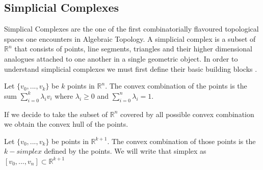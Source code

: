 \subsection{Simplicial Complexes}

Simplical Complexes are the one of the first combinatorially flavoured topological spaces one encounters in Algebraic Topology. A simplicial complex is a subset of $\mathbb{R}^n$ that consists of points, line segments, triangles and their higher dimensional analogues attached to one another in a single geometric object. In order to understand simplicial complexes we must first define their basic building blocks \cite{comp-topo}.

\begin{defn} Let $\{v_0, ..., v_k\}$ be $k$ points in $\mathbb{R}^n$. The convex combination of the points is the sum $\sum_{i=0}^k{\lambda_iv_i}$ where $\lambda_i \ge 0$ and $\sum_{i=0}^n{\lambda_i} = 1$.  \end{defn}

If we decide to take the subset of $\mathbb{R}^n$ covered by all possible convex combination we obtain the convex hull of the points.

\begin{defn} Let $\{v_0, ..., v_k\}$ be points in $\mathbb{R}^{k+1}$. The convex combination of those points is the $k-simplex$ defined by the points. We will write that simplex as $[v_0, ..., v_n] \subset \mathbb{R}^{k+1}$  \end{defn}

